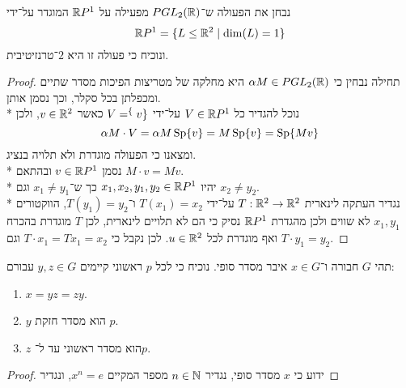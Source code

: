\Subquestion{}
נבחן את הפעולה ש־$PGL_2(\mathbb{R})$ מפעילה על $\mathbb{R} P^1$ המוגדר על־ידי
\[
	\mathbb{R} P^1 = \{ L \le \mathbb{R}^2 \mid \dim(L) = 1 \}
\]
ונוכיח כי פעולה זו היא $2$־טרנזיטיבית.
\begin{proof}
	תחילה נבחין כי $\alpha M \in PGL_2(\mathbb{R})$ היא מחלקה של מטריצות הפיכות מסדר שתיים ומכפלתן בכל סקלר, וכך נסמן אותן. \\*
	נוכל להגדיר כל $V \in \mathbb{R} P^1$ על־ידי $V = \sp\{ v\}$ כאשר $v \in \mathbb{R}^2$, ולכן
	\[
		\alpha M \cdot V = \alpha M \operatorname{Sp}\{ v \} = M \operatorname{Sp}\{ v \} = \operatorname{Sp}\{ Mv \}
	\]
	ומצאנו כי הפעולה מוגדרת ולא תלויה בנציג. \\*
	נסמן $v \in \mathbb{R} P^1$ ובהתאם $M \cdot v = Mv$. \\*
	יהיו $x_1, x_2, y_1, y_2 \in \mathbb{R} P^1$ כך ש־$x_1 \ne y_1$ וגם $x_2 \ne y_2$. \\*
	נגדיר העתקה לינארית $T : \mathbb{R}^2 \to \mathbb{R}^2$ על־ידי $T(x_1) = x_2$ ו־$T(y_1) = y_2$, הווקטורים $x_1, y_1$ לא שווים ולכן מהגדרת $\mathbb{R} P^1$ נסיק כי הם לא תלויים לינארית, לכן $T$ מוגדרת בהכרח ואף מוגדרת לכל $u \in \mathbb{R}^2$.
	לכן נקבל כי $T \cdot x_1 = T x_1 = x_2$ וגם $T \cdot y_1 = y_2$.
\end{proof}

\Question{}
תהי $G$ חבורה ו־$x \in G$ איבר מסדר סופי.
נוכיח כי לכל $p$ ראשוני קיימים $y, z \in G$ עבורם:
\begin{enumerate}
	\item $x = yz = zy$.
	\item $y$ הוא מסדר חזקת $p$.
	\item $z$ הוא מסדר ראשוני עד ל־$p$.
\end{enumerate}
\begin{proof}
	ידוע כי $x$ מסדר סופי, נגדיר $n \in \mathbb{N}$ מספר המקיים $x^n = e$, ונגדיר
\end{proof}


